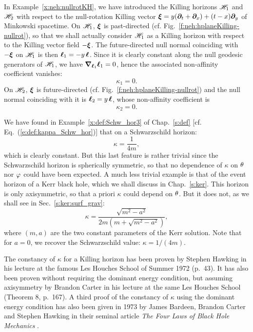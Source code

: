 \begin{example}
\label{x:neh:nullrotKH_kappa}
In Example~\ref{x:neh:nullrotKH}, we have introduced the Killing horizons
$\mathscr{H}_1$ and $\mathscr{H}_2$ with respect to the null-rotation Killing vector
$\bm{\xi} = y( \bm{\partial}_t + \bm{\partial}_x ) + (t-x)\bm{\partial}_y$ of Minkowski spacetime.
On $\mathscr{H}_1$, $\bm{\xi}$ is past-directed (cf. Fig.~\ref{f:neh:hplaneKilling-nullrot}),
so that we shall actually consider $\mathscr{H}_1$
as a Killing horizon with respect to the Killing vector field $-\bm{\xi}$.
The future-directed null normal coinciding with $-\bm{\xi}$ on $\mathscr{H}_1$ is then
$\bm{\ell}_1 = - y\, \bm{\ell}$. Since it is clearly constant along the null geodesic generators
of $\mathscr{H}_1$, we have $\bm{\nabla}_{\bm{\ell}_1}\bm{\ell}_1 = 0$, hence the
associated non-affinity coefficient vanishes:
\[
    \kappa_1 = 0 .
\]
On $\mathscr{H}_2$, $\bm{\xi}$ is future-directed (cf. Fig.~\ref{f:neh:hplaneKilling-nullrot})
and the null normal coinciding with it is $\bm{\ell}_2 =  y\,  \bm{\ell}$, whose non-affinity
coefficient is
\[
    \kappa_2 = 0 .
\]
\end{example}

\begin{example}
\label{x:neh:Schw_Kerr_kappa}
We have found in Example~\ref{x:def:Schw_hor3} of Chap.~\ref{s:def} [cf. Eq.~(\ref{e:def:kappa_Schw_hor})]
that on a Schwarzschild horizon:
\[
  \kappa = \frac{1}{4m},
\]
which is clearly constant. But
this last feature is rather trivial since the Schwarzschild horizon is spherically
symmetric, so that no dependence of $\kappa$ on $\theta$ nor $\varphi$ could have been expected.
A much less trivial example is that of the event horizon of a Kerr black hole,
which we shall discuss in Chap.~\ref{s:ker}. This horizon is only axisymmetric,
so that a priori $\kappa$ could depend on $\theta$. But it does not, as we shall
see in Sec.~\ref{s:ker:surf_grav}:
\[
    \kappa = \frac{\sqrt{m^2 - a^2}}{2m(m + \sqrt{m^2-a^2})} ,
\]
where $(m,a)$ are the two constant parameters of the Kerr solution. Note that for $a=0$,
we recover the Schwarzschild value: $\kappa= 1/(4m)$.
\end{example}

\begin{hist}
The constancy of $\kappa$ for a Killing horizon has been proven by Stephen Hawking
in his lecture at the famous Les Houches School of Summer 1972 \cite{Hawki73} (p.~43).
It has also been proven without requiring the dominant energy condition, but
assuming axisymmetry by Brandon Carter in his lecture at the same Les Houches School
\cite{Carte73b} (Theorem 8, p.~167).
A third proof of the constancy of $\kappa$ using the dominant energy condition
has also been given in 1973 by James Bardeen, Brandon Carter and
Stephen Hawking
in their seminal article \emph{The Four Laws of Black Hole Mechanics}
\cite{BardeCH73}.
\end{hist}

